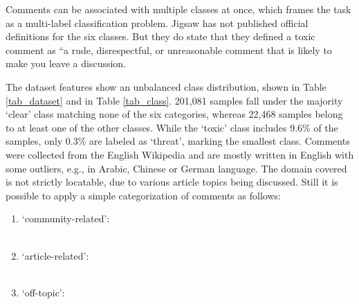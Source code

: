 \documentclass[10.5pt]{article}
\begin{document}
\begin{multicols*}{2}
Comments can be associated  with multiple classes at once, which frames the  task as a multi-label classification problem. Jigsaw has not published official definitions for the  six classes. But they do state that they defined a  toxic comment as “a rude, disrespectful, or unreasonable comment that is likely to make you leave  a discussion.

The dataset features show an unbalanced class distribution, shown in Table \ref{tab_dataset} and in Table \ref{tab_class}. 201,081 samples fall under the majority ‘clear’ class matching none of the six categories, whereas 22,468 samples belong to at least one of the other classes. While the ‘toxic’ class includes 9.6\% of the samples, only 0.3\% are labeled as ‘threat’, marking the smallest class.
Comments were collected from the English Wikipedia and are mostly written in English with some outliers, e.g., in Arabic, Chinese or German language. The domain covered is not strictly locatable, due to various article topics being discussed. Still it is possible to apply a simple categorization of comments as follows: 
\begin{enumerate}
  \item ‘community-related’:\\\\\vspace{0.2cm}
  \item ‘article-related’:\\\\\vspace{0.2cm}
  \item ‘off-topic’:\\\\\vspace{0.2cm}
\end{enumerate}


\end{multicols*}
\end{document}
